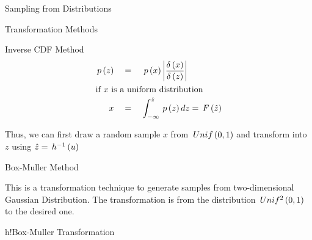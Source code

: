 \documentclass{article}
\begin{document}
\begin{ssection}{Sampling from Distributions}
\begin{ssubsection}{Transformation Methods}
\begin{sssubsection}{Inverse CDF Method}
			\begin{align*}
				\prob{z}	&\eq \prob{x} \abs{\derp{x}{z}} \\
				\shortintertext{if $x$ is a uniform distribution}
				x			&\eq \int_{-\infty}^{\hat{z}} \prob{z} dz = \func{F}{\hat{z}}
			\end{align*}

			Thus, we can first draw a random sample $x$ from $\func{Unif}{0, 1}$ and transform into $z$ using $\hat{z} = \funcinv{h}{u}$

		\end{sssubsection}

		\begin{sssubsection}{Box-Muller Method}

			This is a transformation technique to generate samples from two-dimensional Gaussian Distribution. The transformation is from the distribution $\func{Unif^2}{0, 1}$ to the desired one. \br%

			\begin{algo}{h!}{Box-Muller Transformation}
				

\end{algo}
\end{sssubsection}
\end{ssubsection}
\end{ssection}
\end{document}
